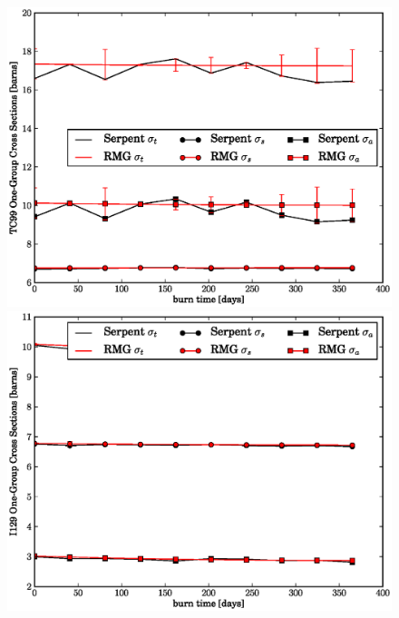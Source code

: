 \begin{figure}[htbp]
\begin{center}
\includegraphics[scale=0.3]{multigroup_method/figs/benchmark/TC99_1g_xs.eps}
\includegraphics[scale=0.3]{multigroup_method/figs/benchmark/I129_1g_xs.eps}
\end{center}
\end{figure}
